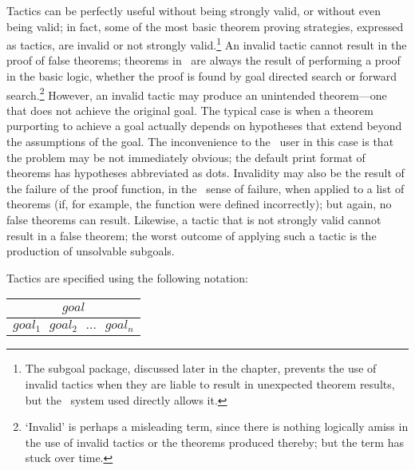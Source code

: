 Tactics can be perfectly useful without being
strongly valid, or without
even being valid;
in fact, some of the most basic theorem proving strategies, expressed
as tactics, are invalid or not strongly valid.\footnote{The subgoal
package, discussed later in the chapter, prevents the use of
invalid tactics when they are liable to result in unexpected
theorem results, but the \HOL\ system used directly allows
it.} An invalid tactic
cannot result in the proof of false theorems;
theorems in \HOL\
are always the result of performing a proof in the basic logic,
whether the proof is found by goal directed search
or forward search.\footnote{`Invalid' is perhaps a misleading term, since
there is nothing logically amiss in the use of invalid tactics
or the theorems produced thereby; but the term has stuck over time.} However, an
invalid tactic may produce an unintended theorem---one that does not
achieve the original goal. The typical case is when a theorem
purporting to achieve a goal
actually depends on hypotheses that extend beyond the assumptions of
the goal.  The inconvenience to the \HOL\ user in this case
is that the problem may be not immediately
obvious; the default print format of theorems has
hypotheses abbreviated as dots. Invalidity may also be the result of the
failure
 of the proof function, in the \ML\ sense of failure, when
applied to a list of theorems (if, for example, the function were
defined incorrectly); but again, no false theorems can result.
Likewise, a tactic that is not strongly valid cannot result in a false
theorem; the worst outcome of applying such a tactic is the production
of unsolvable subgoals.


Tactics are specified using the following notation:

\begin{center}
\begin{tabular}{c} \\
$goal$ \\ \hline \hline
$goal_1\ \ \ goal_2 \ \ \ \ldots\ \ \ goal_n$ \\
\end{tabular}
\end{center}

